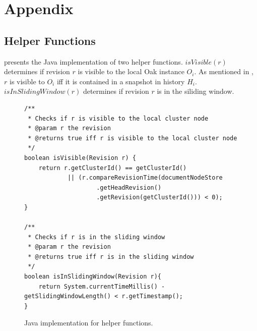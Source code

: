\documentclass[abstracton,12pt]{scrartcl}
\theoremstyle{definition}
\begin{document}
\newpage




\newpage

\section{Appendix}

\subsection{Helper Functions}

 presents the Java implementation of two helper functions.
$isVisible(r)$ determines if revision $r$ is visible to the local Oak instance $O_i$.
As mentioned in \cite{KW17}, $r$ is visible to $O_i$ iff it is contained in a snapshot in history $H_i$.
$isInSlidingWindow(r)$ determines if revision $r$ is in the siliding window.

\begin{figure}[h]
    \begin{framed}
        \begin{scriptsize}
            \begin{verbatim}
/**
 * Checks if r is visible to the local cluster node
 * @param r the revision
 * @returns true iff r is visible to the local cluster node
 */
boolean isVisible(Revision r) {
    return r.getClusterId() == getClusterId()
            || (r.compareRevisionTime(documentNodeStore
                    .getHeadRevision()
                    .getRevision(getClusterId())) < 0);
}

/**
 * Checks if r is in the sliding window
 * @param r the revision
 * @returns true iff r is in the sliding window
 */
boolean isInSlidingWindow(Revision r){
    return System.currentTimeMillis() - getSlidingWindowLength() < r.getTimestamp();
}
            \end{verbatim}
        \end{scriptsize}
    \end{framed}
    \caption{Java implementation for helper functions.}
    \label{fig:helper_functions}
\end{figure}
\end{document}
